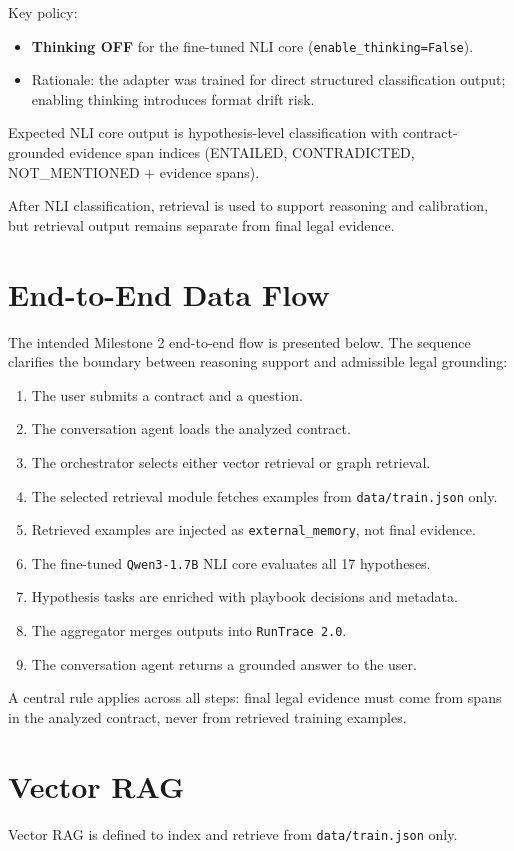 \documentclass[11pt]{article}
\begin{document}
Key policy:
\begin{itemize}
  \item \textbf{Thinking OFF} for the fine-tuned NLI core (\texttt{enable\_thinking=False}).
  \item Rationale: the adapter was trained for direct structured classification output; enabling thinking introduces format drift risk.
\end{itemize}

Expected NLI core output is hypothesis-level classification with contract-grounded evidence span indices (ENTAILED, CONTRADICTED, NOT\_MENTIONED + evidence spans).

After NLI classification, retrieval is used to support reasoning and calibration, but retrieval output remains separate from final legal evidence.

\section{End-to-End Data Flow}
The intended Milestone 2 end-to-end flow is presented below. The sequence clarifies the boundary between reasoning support and admissible legal grounding:
\begin{enumerate}
  \item The user submits a contract and a question.
  \item The conversation agent loads the analyzed contract.
  \item The orchestrator selects either vector retrieval or graph retrieval.
  \item The selected retrieval module fetches examples from \texttt{data/train.json} only.
  \item Retrieved examples are injected as \texttt{external\_memory}, not final evidence.
  \item The fine-tuned \texttt{Qwen3-1.7B} NLI core evaluates all 17 hypotheses.
  \item Hypothesis tasks are enriched with playbook decisions and metadata.
  \item The aggregator merges outputs into \texttt{RunTrace 2.0}.
  \item The conversation agent returns a grounded answer to the user.
\end{enumerate}

A central rule applies across all steps: final legal evidence must come from spans in the analyzed contract, never from retrieved training examples.

\section{Vector RAG}
Vector RAG is defined to index and retrieve from \texttt{data/train.json} only.
\end{document}

